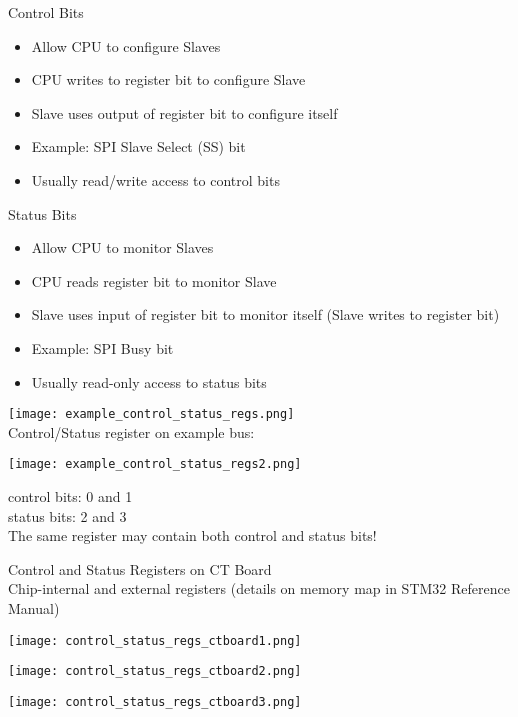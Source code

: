 
\begin{concept}{Control Bits}
    \begin{itemize}
        \item Allow CPU to configure Slaves
        \item CPU writes to register bit to configure Slave
        \item Slave uses output of register bit to configure itself
        \item Example: SPI Slave Select (SS) bit
        \item Usually read/write access to control bits
    \end{itemize}
\end{concept}

\begin{concept}{Status Bits}
    \begin{itemize}
        \item Allow CPU to monitor Slaves
        \item CPU reads register bit to monitor Slave
        \item Slave uses input of register bit to monitor itself (Slave writes to register bit)
        \item Example: SPI Busy bit
        \item Usually read-only access to status bits
    \end{itemize}
\end{concept}

\multend

\begin{example}
\texttt{[image: example\_control\_status\_regs.png]}\\
Control/Status register on example bus:

\begin{minipage}{0.5\linewidth}
\texttt{[image: example\_control\_status\_regs2.png]}
\end{minipage}
\begin{minipage}{0.4\linewidth}
control bits: 0 and 1\\
status bits: 2 and 3\\
The same register may contain both control and status bits!
\end{minipage}
\end{example}

\begin{theorem}{Control and Status Registers on CT Board}\\
    Chip-internal and external registers (details on memory map in STM32 Reference Manual)

    \begin{minipage}{0.4\linewidth}
    \texttt{[image: control\_status\_regs\_ctboard1.png]}
    \end{minipage}
    \begin{minipage}{0.54\linewidth}
    \texttt{[image: control\_status\_regs\_ctboard2.png]}
    \end{minipage}

    \texttt{[image: control\_status\_regs\_ctboard3.png]}
\end{theorem}



